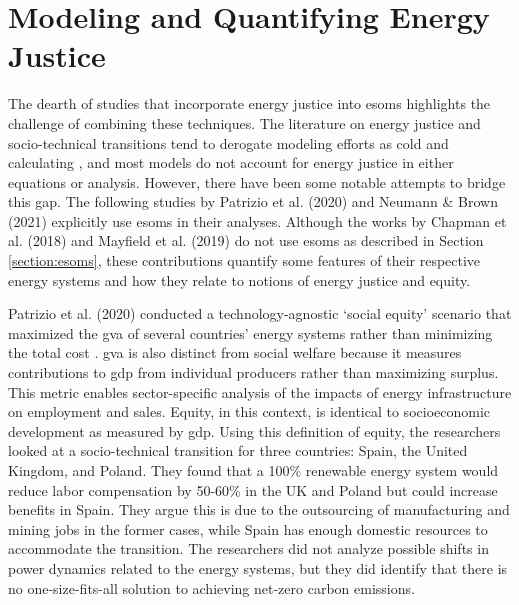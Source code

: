 \section{Modeling and Quantifying Energy Justice}

The dearth of studies that incorporate energy justice into \acp{esom} highlights
the challenge of combining these techniques. The literature on energy justice and
socio-technical transitions tend to derogate modeling efforts as cold and
calculating \cite{sovacool_energy_2015,sovacool_energy_2016}, and most models do
not account for energy justice in either equations or analysis. However, there
have been some notable attempts to bridge this gap. The following studies by Patrizio 
et al. (2020) \cite{patrizio_socially_2020} and Neumann \& Brown (2021) \cite{neumann_near-optimal_2021}
explicitly use \acp{esom} in their analyses. Although the works by Chapman et al. (2018)
\cite{chapman_prioritizing_2018} and Mayfield et al. (2019) \cite{mayfield_quantifying_2019}
do not use \acp{esom} as described in Section \ref{section:esoms}, these contributions
quantify some features of their respective energy systems and how they relate to
notions of energy justice and equity.

Patrizio et al. (2020) conducted a technology-agnostic `social equity' scenario
that maximized the \ac{gva} of several countries' energy systems rather than
minimizing the total cost \cite{patrizio_socially_2020}. \Ac{gva} is also
distinct from social welfare because it measures contributions to \ac{gdp} from
individual producers rather than maximizing surplus. This metric enables
sector-specific analysis of the impacts of energy infrastructure on employment
and sales. Equity, in this context, is identical to socioeconomic development as
measured by \ac{gdp}. Using this definition of equity, the researchers looked at a 
socio-technical transition for
three countries: Spain, the United Kingdom, and Poland. They found that a 100\%
renewable energy system would reduce labor compensation by 50-60\% in the UK and
Poland but could increase benefits in Spain. They argue this is due to the
outsourcing of manufacturing and mining jobs in the former cases, while Spain
has enough domestic resources to accommodate the transition. The researchers did
not analyze possible shifts in power dynamics related to the energy systems, but
they did identify that there is no one-size-fits-all solution to achieving
net-zero carbon emissions.

